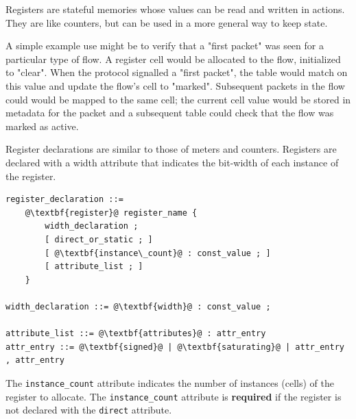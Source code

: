 \documentclass[12pt]{article}
\begin{document}
Registers are stateful memories whose values can be read and written
in actions.  They are like counters, but can be used in a more general
way to keep state.

A simple example use might be to verify that a "first packet" was seen
for a particular type of flow. A register cell would be allocated to
the flow, initialized to "clear". When the protocol signalled a "first
packet", the table would match on this value and update the flow's
cell to "marked".  Subsequent packets in the flow could would be
mapped to the same cell; the current cell value would be stored in
metadata for the packet and a subsequent table could check that the
flow was marked as active.

Register declarations are similar to those of meters and
counters. Registers are declared with a width
attribute that indicates the bit-width of each instance of
the register.

\begin{lstlisting}[frame=single,backgroundcolor=\color{bnfgreen},escapechar=\@]
register_declaration ::= 
    @\textbf{register}@ register_name {
        width_declaration ;
        [ direct_or_static ; ]
        [ @\textbf{instance\_count}@ : const_value ; ]
        [ attribute_list ; ]
    }

width_declaration ::= @\textbf{width}@ : const_value ;

attribute_list ::= @\textbf{attributes}@ : attr_entry
attr_entry ::= @\textbf{signed}@ | @\textbf{saturating}@ | attr_entry , attr_entry
\end{lstlisting}


The \texttt{instance_count} attribute indicates the number of 
instances (cells) of the register to allocate. The 
\texttt{instance_count} attribute is \textbf{required} if the 
register is not declared with the \texttt{direct} attribute.

%
%
%
%
\end{document}
